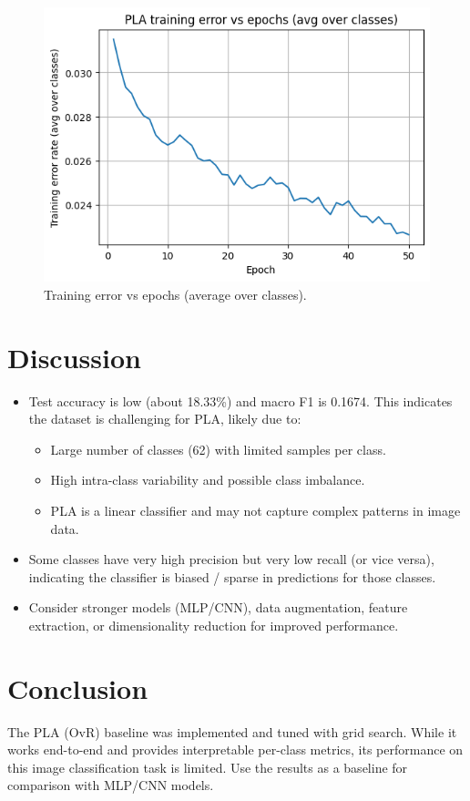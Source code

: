\documentclass[11pt,a4paper]{article}
\begin{document}
\begin{figure}[H]
  \centering
  \includegraphics[width=0.7\linewidth]{PLA_images/error.png}
  \caption{Training error vs epochs (average over classes).}
  \label{fig:trainerr}
\end{figure}

\section{Discussion}
\begin{itemize}
  \item Test accuracy is low (about 18.33\%) and macro F1 is 0.1674. This indicates the dataset is challenging for PLA, likely due to:
    \begin{itemize}
      \item Large number of classes (62) with limited samples per class.
      \item High intra-class variability and possible class imbalance.
      \item PLA is a linear classifier and may not capture complex patterns in image data.
    \end{itemize}
  \item Some classes have very high precision but very low recall (or vice versa), indicating the classifier is biased / sparse in predictions for those classes.
  \item Consider stronger models (MLP/CNN), data augmentation, feature extraction, or dimensionality reduction for improved performance.
\end{itemize}

\section{Conclusion}
The PLA (OvR) baseline was implemented and tuned with grid search. While it works end-to-end and provides interpretable per-class metrics, its performance on this image classification task is limited. Use the results as a baseline for comparison with MLP/CNN models.

\appendix
\end{document}
